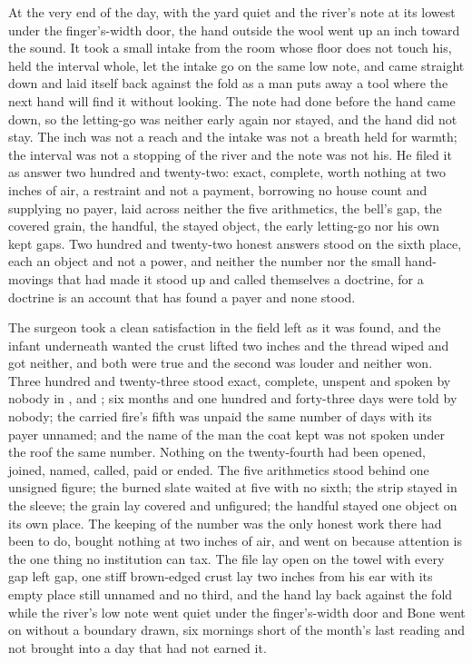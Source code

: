 At the very end of the day, with the yard quiet and the river's note at its lowest under the finger's-width door, the hand outside the wool went up an inch toward the sound. It took a small intake from the room whose floor does not touch his, held the interval whole, let the intake go on the same low note, and came straight down and laid itself back against the fold as a man puts away a tool where the next hand will find it without looking. The note had done before the hand came down, so the letting-go was neither early again nor stayed, and the hand did not stay. The inch was not a reach and the intake was not a breath held for warmth; the interval was not a stopping of the river and the note was not his. He filed it as answer two hundred and twenty-two: exact, complete, worth nothing at two inches of air, a restraint and not a payment, borrowing no house count and supplying no payer, laid across neither the five arithmetics, the bell's gap, the covered grain, the handful, the stayed object, the early letting-go nor his own kept gaps. Two hundred and twenty-two honest answers stood on the sixth place, each an object and not a power, and neither the number nor the small hand-movings that had made it stood up and called themselves a doctrine, for a doctrine is an account that has found a payer and none stood.

The surgeon took a clean satisfaction in the field left as it was found, and the infant underneath wanted the crust lifted two inches and the thread wiped and got neither, and both were true and the second was louder and neither won. Three hundred and twenty-three stood exact, complete, unspent and spoken by nobody in ,  and ; six months and one hundred and forty-three days were told by nobody; the carried fire's fifth was unpaid the same number of days with its payer unnamed; and the name of the man the coat kept was not spoken under the roof the same number. Nothing on the twenty-fourth had been opened, joined, named, called, paid or ended. The five arithmetics stood behind one unsigned figure; the burned slate waited at five with no sixth; the strip stayed in the sleeve; the grain lay covered and unfigured; the handful stayed one object on its own place. The keeping of the number was the only honest work there had been to do, bought nothing at two inches of air, and went on because attention is the one thing no institution can tax. The file lay open on the towel with every gap left gap, one stiff brown-edged crust lay two inches from his ear with its empty place still unnamed and no third, and the hand lay back against the fold while the river's low note went quiet under the finger's-width door and Bone went on without a boundary drawn, six mornings short of the month's last reading and not brought into a day that had not earned it.
